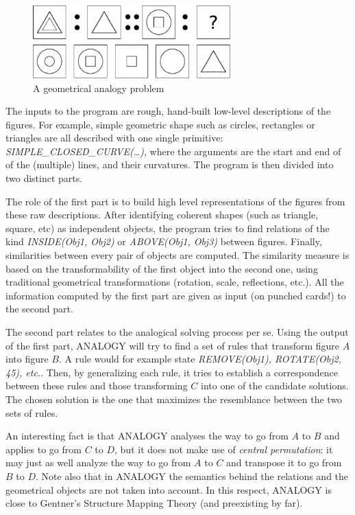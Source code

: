 \begin{figure}[!h]
\centering
\includegraphics[width=3in]{figures/evans.pdf}
\caption{A geometrical analogy problem}
\label{FIG:evans}
\end{figure}

The inputs to the program are rough, hand-built low-level descriptions of the
figures. For example, simple geometric shape such as circles, rectangles or
triangles are all described with one single primitive:
\textit{SIMPLE\_CLOSED\_CURVE(\dots)}, where the arguments are the start and
end of of the (multiple) lines, and their curvatures. The program is then
divided into two distinct parts.

The role of the first part is to build high level representations of the
figures from these raw descriptions. After identifying coherent shapes (such as
triangle, square, etc) as independent objects, the program tries to find
relations of the kind \textit{INSIDE(Obj1, Obj2)} or \textit{ABOVE(Obj1, Obj3)}
between figures. Finally, similarities between every pair of objects are
computed. The similarity measure is based on the transformability of the first
object into the second one, using traditional geometrical transformations
(rotation, scale, reflections, etc.). All the information computed by the first
part are given as input (on punched cards!) to the second part.

The second part relates to the analogical solving process per se. Using the
output of the first part, ANALOGY will try to find a set of rules that
transform figure $A$ into figure $B$. A rule would for example state
\textit{REMOVE(Obj1), ROTATE(Obj2, 45\degree), etc.}. Then, by generalizing
each rule, it tries to establish a correspondence between these rules and those
transforming $C$ into one of the candidate solutions. The chosen solution is
the one that maximizes the resemblance between the two sets of rules.

An interesting fact is that ANALOGY analyses the way to go from $A$ to $B$ and
applies to go from $C$ to $D$, but it does not make use of \textit{central
permutation}: it may just as well analyze the way to go from $A$ to $C$ and
transpose it to go from $B$ to $D$. Note also that in ANALOGY the semantics
behind the relations and the geometrical objects are not taken into account. In
this respect, ANALOGY is close to Gentner's Structure Mapping Theory (and
preexisting by far).


